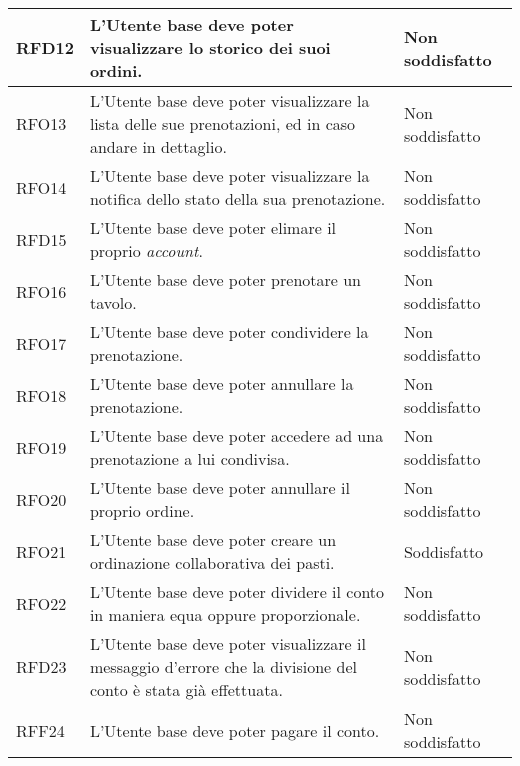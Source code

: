 \begin{longtable}{|l|p{}|p{3cm}|}
	\hline
	RFD12       & L'Utente base deve poter visualizzare lo storico dei suoi ordini.                                                       & Non soddisfatto \\
	\hline
	RFO13       & L'Utente base deve poter visualizzare la lista delle sue prenotazioni, ed in caso andare in dettaglio.                  & Non soddisfatto \\
	\hline
	RFO14       & L'Utente base deve poter visualizzare la notifica dello stato della sua prenotazione.                                   & Non soddisfatto \\
	\hline
	RFD15       & L'Utente base deve poter elimare il proprio \textit{account}.                                                           & Non soddisfatto \\
	\hline
	RFO16       & L'Utente base deve poter prenotare un tavolo.                                                                           & Non soddisfatto \\
	\hline
	RFO17       & L'Utente base deve poter condividere la prenotazione.                                                                   & Non soddisfatto \\
	\hline
	RFO18       & L'Utente base deve poter annullare la prenotazione.                                                                     & Non soddisfatto \\
	\hline
	RFO19       & L'Utente base deve poter accedere ad una prenotazione a lui condivisa.                            					  & Non soddisfatto \\
	\hline
	RFO20       & L'Utente base deve poter annullare il proprio ordine.                                                                   & Non soddisfatto \\
	\hline
	RFO21       & L'Utente base deve poter creare un ordinazione collaborativa dei pasti.                                                 & Soddisfatto \\
	\hline
	RFO22       & L'Utente base deve poter dividere il conto in maniera equa oppure proporzionale.                               		& Non soddisfatto                                                  \\
	\hline
	RFD23       & L'Utente base deve poter visualizzare il messaggio d'errore che la divisione del conto è stata già effettuata. 		& Non soddisfatto                                       \\
	\hline
	RFF24       & L'Utente base deve poter pagare il conto.                                                                      		& Non soddisfatto                                                                             \\

\end{longtable}
